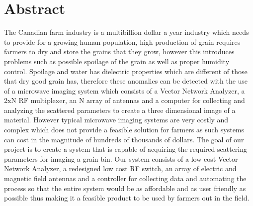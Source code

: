 
\section*{{\Huge Abstract}}


The Canadian farm industry is a multibillion dollar a year industry which needs to provide for a growing human population, high production of grain requires farmers to dry and store the grains that they grow, however this introduces problems such as possible spoilage of the grain as well as proper humidity control. Spoilage and water has dielectric properties which are different of those that dry good grain has, therefore these anomalies can be detected with the use of a microwave imaging system which consists of a Vector Network Analyzer, a 2xN RF multiplexer, an N array of antennas and a computer for collecting and analyzing the scattered parameters to create a three dimensional image of a material. However typical microwave imaging systems are very costly and complex which does not provide a feasible solution for farmers as such systems can cost in the magnitude of hundreds of thousands of dollars. The goal of our project is to create a system that is capable of acquiring the required scattering parameters for imaging a grain bin. Our system consists of a low cost Vector Network Analyzer, a redesigned low cost RF switch, an array of electric and magnetic field antennas and a controller for collecting data and automating the process so that the entire system would be as affordable and as user friendly as possible thus making it a feasible product to be used by farmers out in the field.